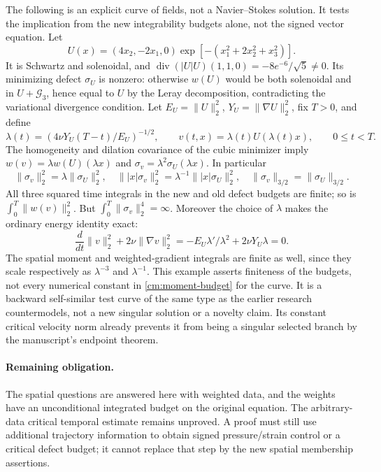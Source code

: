 \begin{remark}
\label{cm:scaling-test}
The following is an explicit curve of fields, not a Navier--Stokes
solution. It tests the implication from the new integrability budgets
alone, not the signed vector equation. Let
\[
 U(x)=(4x_2,-2x_1,0)\exp[-(x_1^2+2x_2^2+x_3^2)].
\]
It is Schwartz and solenoidal, and
$\operatorname{div}(|U|U)(1,1,0)=-8e^{-6}/\sqrt5\ne0$.
Its minimizing defect $\sigma_U$ is nonzero: otherwise $w(U)$ would
be both solenoidal and in $U+\mathcal G_3$, hence equal to $U$ by the
Leray decomposition, contradicting the variational divergence condition.
Let $E_U=\|U\|_2^2$, $Y_U=\|\nabla U\|_2^2$, fix $T>0$, and define
\[
 \lambda(t)=\left(4\nu Y_U(T-t)/E_U\right)^{-1/2},\qquad
 v(t,x)=\lambda(t)U(\lambda(t)x),\qquad 0\le t<T.
\]
The homogeneity and dilation covariance of the cubic minimizer imply
$w(v)=\lambda w(U)(\lambda x)$ and
$\sigma_v=\lambda^2\sigma_U(\lambda x)$. In particular
\[
 \|\sigma_v\|_2^2=\lambda\|\sigma_U\|_2^2,\quad
 \||x|\sigma_v\|_2^2=\lambda^{-1}\||x|\sigma_U\|_2^2,\quad
 \|\sigma_v\|_{3/2}=\|\sigma_U\|_{3/2}.
\]
All three squared time integrals in the new and old defect budgets are
finite; so is $\int_0^T\|w(v)\|_2^2$. But
$\int_0^T\|\sigma_v\|_2^4=\infty$. Moreover the choice of $\lambda$
makes the ordinary energy identity exact:
\[
 \frac{d}{dt}\|v\|_2^2+2\nu\|\nabla v\|_2^2
 =-E_U\lambda'/\lambda^2+2\nu Y_U\lambda=0.
\]
The spatial moment and weighted-gradient integrals are finite as well,
since they scale respectively as $\lambda^{-3}$ and $\lambda^{-1}$.
This example asserts finiteness of the budgets, not every numerical
constant in \eqref{cm:moment-budget} for the curve. It is a backward
self-similar test curve of the same type as the earlier research
countermodels, not a new singular solution or a novelty claim. Its
constant critical velocity norm already prevents it from being a
singular selected branch by the manuscript's endpoint theorem.
\end{remark}

\paragraph{Remaining obligation.}
The spatial questions are answered here with weighted data, and the
weights have an unconditional integrated budget on the original equation.
The arbitrary-data critical temporal estimate remains unproved. A proof
must still use additional trajectory information to obtain signed
pressure/strain control or a critical defect budget; it cannot replace
that step by the new spatial membership assertions.

